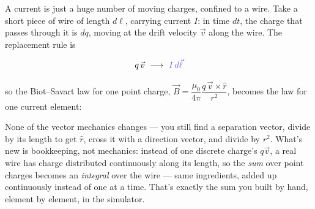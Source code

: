 \documentclass[12pt]{article}
\newcommand{\ANS}[1]{\textcolor{accent}{#1}}
\newcommand{\disc}[1]{{\small\color{accent} #1}}
\begin{document}

A current is just a huge number of moving charges, confined to a wire. Take
a short piece of wire of length $d\ell$, carrying current $I$: in time $dt$,
the charge that passes through it is $dq$, moving at the drift velocity
$\vec v$ along the wire. The replacement rule is

\[
q\,\vec v \ \longrightarrow\ \ANS{I\,d\vec\ell}
\]

so the Biot--Savart law for one point charge, $\vec B = \dfrac{\mu_0}{4\pi}
\dfrac{q\,\vec v\times\hat r}{r^2}$, becomes the law for one current
element:

\result[2.4cm]{$d\vec B = \ANS{\dfrac{\mu_0}{4\pi}\,\dfrac{I\,d\vec\ell
\times\hat r}{r^2}}$}


\disc{None of the vector mechanics changes --- you still find a separation
vector, divide by its length to get $\hat r$, cross it with a direction
vector, and divide by $r^2$. What's new is bookkeeping, not mechanics:
instead of one discrete charge's $q\vec v$, a real wire has charge
distributed continuously along its length, so the \emph{sum} over point
charges becomes an \emph{integral} over the wire --- same ingredients, added
up continuously instead of one at a time. That's exactly the sum you built
by hand, element by element, in the simulator.}
\end{document}
